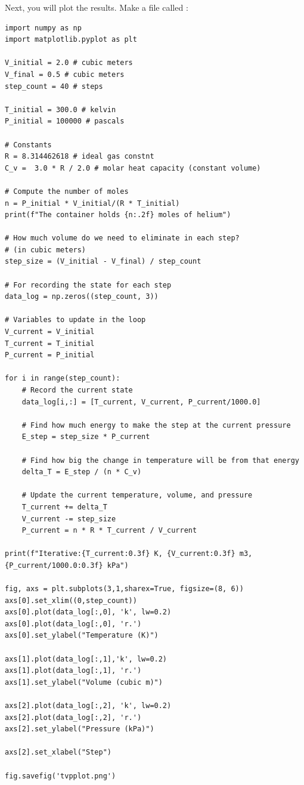 Next, you will plot the results.  Make a file called :

\begin{Verbatim}
import numpy as np
import matplotlib.pyplot as plt

V_initial = 2.0 # cubic meters
V_final = 0.5 # cubic meters
step_count = 40 # steps

T_initial = 300.0 # kelvin
P_initial = 100000 # pascals

# Constants
R = 8.314462618 # ideal gas constnt
C_v =  3.0 * R / 2.0 # molar heat capacity (constant volume)

# Compute the number of moles
n = P_initial * V_initial/(R * T_initial) 
print(f"The container holds {n:.2f} moles of helium")

# How much volume do we need to eliminate in each step? 
# (in cubic meters)
step_size = (V_initial - V_final) / step_count

# For recording the state for each step
data_log = np.zeros((step_count, 3))

# Variables to update in the loop
V_current = V_initial
T_current = T_initial
P_current = P_initial

for i in range(step_count):
    # Record the current state
    data_log[i,:] = [T_current, V_current, P_current/1000.0]

    # Find how much energy to make the step at the current pressure
    E_step = step_size * P_current

    # Find how big the change in temperature will be from that energy
    delta_T = E_step / (n * C_v)

    # Update the current temperature, volume, and pressure
    T_current += delta_T
    V_current -= step_size
    P_current = n * R * T_current / V_current

print(f"Iterative:{T_current:0.3f} K, {V_current:0.3f} m3, {P_current/1000.0:0.3f} kPa")

fig, axs = plt.subplots(3,1,sharex=True, figsize=(8, 6))
axs[0].set_xlim((0,step_count))
axs[0].plot(data_log[:,0], 'k', lw=0.2)
axs[0].plot(data_log[:,0], 'r.')
axs[0].set_ylabel("Temperature (K)")

axs[1].plot(data_log[:,1],'k', lw=0.2)
axs[1].plot(data_log[:,1], 'r.')
axs[1].set_ylabel("Volume (cubic m)")

axs[2].plot(data_log[:,2], 'k', lw=0.2)
axs[2].plot(data_log[:,2], 'r.')
axs[2].set_ylabel("Pressure (kPa)")

axs[2].set_xlabel("Step")

fig.savefig('tvpplot.png')
\end{Verbatim}

